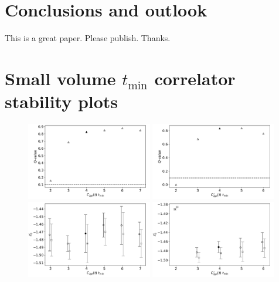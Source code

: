 \documentclass[prd,aps,twocolumn,superscriptaddress,tightenlines,nofootinbib,floatfix,preprintnumbers,10pt]{revtex4-1}
\begin{document}
\section{Conclusions and outlook}
This is a great paper. Please publish. Thanks.



\appendix

\clearpage
\newpage
\onecolumngrid
\section{Small volume $t_{\mathrm{min}}$ correlator stability plots}
\begin{figure}[h]{
		\includegraphics[width=0.49\textwidth]{plots/figures/3296_2pt_Q.pdf}
		\includegraphics[width=0.49\textwidth]{plots/figures/3296_d2pt_Q.pdf}
		\includegraphics[width=0.49\textwidth]{plots/figures/3296_2pt_dZ0.pdf}
		\includegraphics[width=0.49\textwidth]{plots/figures/3296_d2pt_dZ0.pdf}
}
\end{figure}
\end{document}
